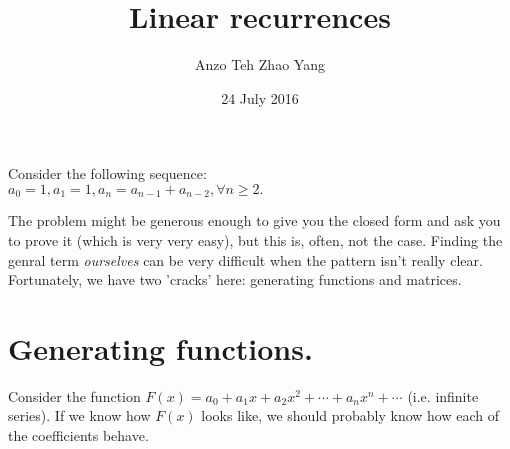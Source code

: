 \documentclass[11pt,a4paper]{article}
\begin{document}
\title{Linear recurrences}
\author{Anzo Teh Zhao Yang}
\date{24 July 2016}
\maketitle

Consider the following sequence:\\
$a_0=1, a_1=1, a_n=a_{n-1}+a_{n-2}, \forall n\ge 2.$

The problem might be generous enough to give you the closed form and ask you to prove it (which is very very easy), but this is, often, not the case. Finding the genral term \emph{ourselves} can be very difficult when the pattern isn't really clear. Fortunately, we have two 'cracks' here: generating functions and matrices.

\section {Generating functions.}
Consider the function $F(x)=a_0+a_1x+a_2x^2+\cdots +a_nx^n+\cdots $ (i.e. infinite series). If we know how $F(x)$ looks like, we should probably know how each of the coefficients behave.
\end{document}

